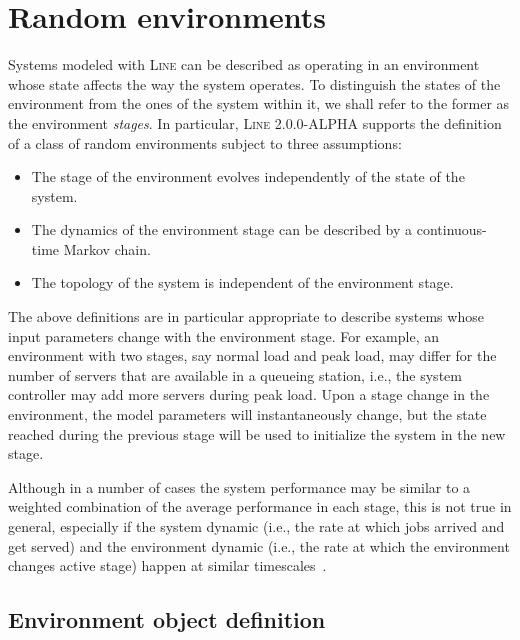 \chapter{Random environments}
\label{Random-environments}
Systems modeled with \textsc{Line} can be described as operating in an environment whose state affects the way the system operates. To distinguish the states of the environment from the ones of the system within it, we shall refer to the former as the environment {\em stages}.  In particular, \textsc{Line} 2.0.0-ALPHA supports the definition of a class of random environments subject to three assumptions:
\begin{itemize}
\item The stage of the environment evolves independently of the state of the system.
\item The dynamics of the environment stage can be described by a continuous-time Markov chain.
\item The topology of the system is independent of the environment stage.
\end{itemize}
The above definitions are in particular appropriate to describe systems whose input parameters change with the environment stage. For example, an environment with two stages, say normal load and peak load, may differ for the number of servers that are available in a queueing station, i.e., the system controller may add more servers during peak load. Upon a stage change in the environment, the model parameters will instantaneously change, but the state reached during the previous stage will be used to initialize the system in the new stage.

Although in a number of cases the system performance may be similar to a weighted combination of the average performance in each stage, this is not true in general, especially if the system dynamic (i.e., the rate at which jobs arrived and get served) and the environment dynamic (i.e., the rate at which the environment changes active stage) happen at similar timescales~\cite{CasTH14}.

\section{Environment object definition}
\label{environment-object-definition}
